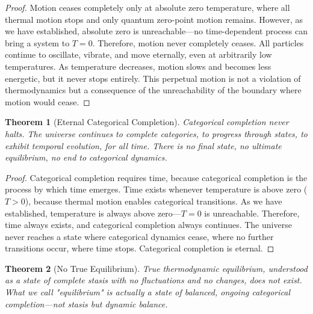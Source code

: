 \documentclass[12pt,a4paper]{article}
\newtheorem{theorem}{Theorem}[section]
\theoremstyle{definition}
\theoremstyle{remark}
\begin{document}
\begin{proof}
Motion ceases completely only at absolute zero temperature, where all thermal motion stops and only quantum zero-point motion remains. However, as we have established, absolute zero is unreachable—no time-dependent process can bring a system to $T = 0$. Therefore, motion never completely ceases. All particles continue to oscillate, vibrate, and move eternally, even at arbitrarily low temperatures. As temperature decreases, motion slows and becomes less energetic, but it never stops entirely. This perpetual motion is not a violation of thermodynamics but a consequence of the unreachability of the boundary where motion would cease.
\end{proof}

\begin{theorem}[Eternal Categorical Completion]
\label{thm:eternal_completion}
Categorical completion never halts. The universe continues to complete categories, to progress through states, to exhibit temporal evolution, for all time. There is no final state, no ultimate equilibrium, no end to categorical dynamics.
\end{theorem}

\begin{proof}
Categorical completion requires time, because categorical completion is the process by which time emerges. Time exists whenever temperature is above zero ($T > 0$), because thermal motion enables categorical transitions. As we have established, temperature is always above zero—$T = 0$ is unreachable. Therefore, time always exists, and categorical completion always continues. The universe never reaches a state where categorical dynamics cease, where no further transitions occur, where time stops. Categorical completion is eternal.
\end{proof}

\begin{theorem}[No True Equilibrium]
\label{thm:no_equilibrium}
True thermodynamic equilibrium, understood as a state of complete stasis with no fluctuations and no changes, does not exist. What we call "equilibrium" is actually a state of balanced, ongoing categorical completion—not stasis but dynamic balance.
\end{theorem}
\end{document}
